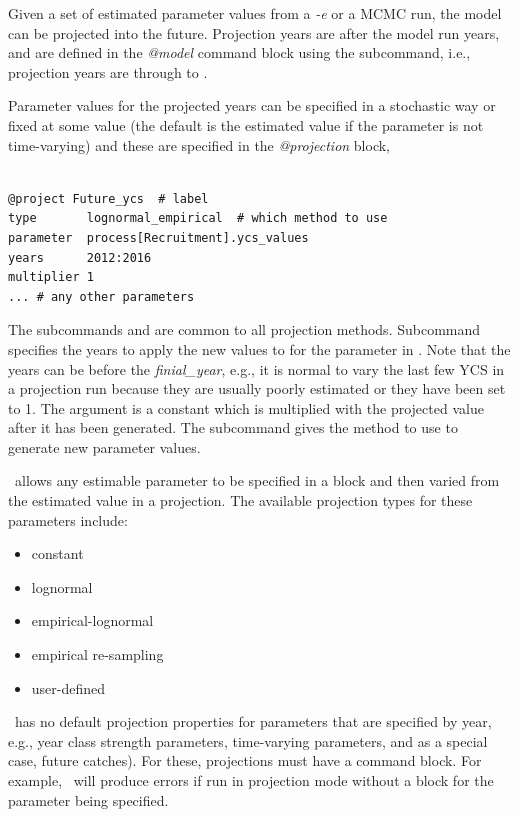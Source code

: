 Given a set of estimated parameter values from a \textit{-e} or a MCMC run,
the model can be projected into the future. Projection years are after the model run years, and are defined in the \textit{@model} command block using the  subcommand, i.e., projection years are  through to .

Parameter values for the projected years can be specified in a stochastic way or fixed at some value (the default is the estimated value if the parameter is not time-varying) and these are specified in the \textit{@projection} block,

{\small{\begin{verbatim}

@project Future_ycs  # label
type       lognormal_empirical  # which method to use
parameter  process[Recruitment].ycs_values
years      2012:2016
multiplier 1
... # any other parameters
\end{verbatim}}}

The subcommands  and  are common to all projection methods. Subcommand  specifies the years to apply the new values to for the parameter in . Note that the years can be before the \textit{finial\_year}, e.g., it is normal to vary the last few YCS in a projection run because they are usually poorly estimated or they have been set to 1.  The argument  is a constant which is multiplied with the projected value after it has been generated. The  subcommand gives the method to use to generate new parameter values.

\CNAME\ allows any estimable parameter to be specified in a  block and then varied from the estimated value in a projection. The available projection types for these parameters include:

\begin{itemize}
	\item constant
	\item lognormal
	\item empirical-lognormal
	\item empirical re-sampling
	\item user-defined
\end{itemize}

\CNAME\ has no default projection properties for parameters that are specified by year, e.g., year class strength parameters, time-varying parameters, and as a special case, future catches). For these, projections  must have a  command block. For example, \CNAME\ will produce errors if run in projection mode without a  block for the  parameter being specified.

